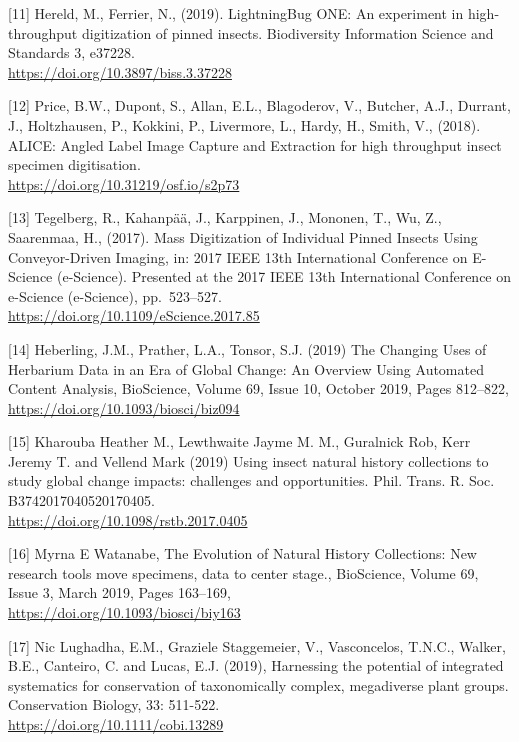 {[}11{]} Hereld, M., Ferrier, N., (2019). LightningBug ONE: An
experiment in high-throughput digitization of pinned insects.
Biodiversity Information Science and Standards 3, e37228.\\
\url{https://doi.org/10.3897/biss.3.37228}

{[}12{]} Price, B.W., Dupont, S., Allan, E.L., Blagoderov, V., Butcher,
A.J., Durrant, J., Holtzhausen, P., Kokkini, P., Livermore, L., Hardy,
H., Smith, V., (2018). ALICE: Angled Label Image Capture and Extraction
for high throughput insect specimen digitisation.\\
\url{https://doi.org/10.31219/osf.io/s2p73}

{[}13{]} Tegelberg, R., Kahanpää, J., Karppinen, J., Mononen, T., Wu,
Z., Saarenmaa, H., (2017). Mass Digitization of Individual Pinned
Insects Using Conveyor-Driven Imaging, in: 2017 IEEE 13th International
Conference on E-Science (e-Science). Presented at the 2017 IEEE 13th
International Conference on e-Science (e-Science), pp.~523--527.\\
\url{https://doi.org/10.1109/eScience.2017.85}

{[}14{]} Heberling, J.M., Prather, L.A., Tonsor, S.J. (2019) The
Changing Uses of Herbarium Data in an Era of Global Change: An Overview
Using Automated Content Analysis, BioScience, Volume 69, Issue 10,
October 2019, Pages 812--822,\\
\url{https://doi.org/10.1093/biosci/biz094}

{[}15{]} Kharouba Heather M., Lewthwaite Jayme M. M., Guralnick Rob,
Kerr Jeremy T. and Vellend Mark (2019) Using insect natural history
collections to study global change impacts: challenges and
opportunities. Phil. Trans. R. Soc. B3742017040520170405.\\
\url{https://doi.org/10.1098/rstb.2017.0405}

{[}16{]} Myrna E Watanabe, The Evolution of Natural History Collections:
New research tools move specimens, data to center stage., BioScience,
Volume 69, Issue 3, March 2019, Pages 163--169,\\
\url{https://doi.org/10.1093/biosci/biy163}

{[}17{]} Nic Lughadha, E.M., Graziele Staggemeier, V., Vasconcelos,
T.N.C., Walker, B.E., Canteiro, C. and Lucas, E.J. (2019), Harnessing
the potential of integrated systematics for conservation of
taxonomically complex, megadiverse plant groups. Conservation Biology,
33: 511-522.\\
\url{https://doi.org/10.1111/cobi.13289}

